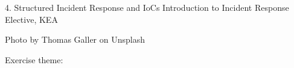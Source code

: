 \documentclass[Screen16to9,17pt]{foils}
\begin{document}
\mytitlepage
{4. Structured Incident Response and IoCs}
{Introduction to Incident Response Elective, KEA}




\begin{list2}
\item
\item
\item
\end{list2}

Photo by Thomas Galler on Unsplash


\begin{list2}
\item
\item
\item
\item
\item
\end{list2}

Exercise theme:
\begin{list2}
\item
\item
\item
\end{list2}


\end{document}
